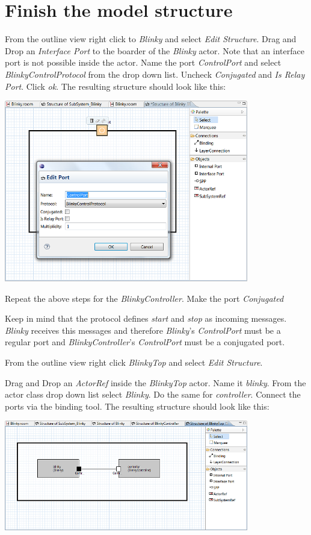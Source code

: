 \section{Finish the model structure}

From the outline view right click to \textit{Blinky} and select \textit{Edit Structure}. Drag and Drop an \textit{Interface Port} to the boarder of the \textit{Blinky} actor. Note that an interface port is not possible inside the actor. Name the port \textit{ControlPort} and select \textit{BlinkyControlProtocol} from the drop down list. Uncheck \textit{Conjugated} and \textit{Is Relay Port}. Click \textit{ok}. The resulting structure should look like this:

\includegraphics[width=0.8\textwidth]{images/020-Blinky04.png}

Repeat the above steps for the \textit{BlinkyController}. Make the port \textit{Conjugated}

Keep in mind that the protocol defines \textit{start} and \textit{stop} as incoming messages. \textit{Blinky} receives this messages and therefore \textit{Blinky}'s \textit{ControlPort} must be a regular port and \textit{BlinkyController}'s \textit{ControlPort} must be a conjugated port.


From the outline view right click \textit{BlinkyTop} and select \textit{Edit Structure}.

Drag and Drop an \textit{ActorRef} inside the \textit{BlinkyTop} actor. Name it \textit{blinky}. From the actor class drop down list select \textit{Blinky}. Do the same for \textit{controller}. Connect the ports via the binding tool. The resulting structure should look like this:

\includegraphics[width=0.8\textwidth]{images/020-Blinky05.png}

